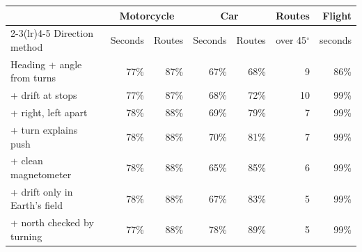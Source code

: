 \begin{tabular}{lrrrrrr}
\toprule
 & \multicolumn{2}{c}{Motorcycle} & \multicolumn{2}{c}{Car} & Routes & Flight\\
\cmidrule(lr){2-3}\cmidrule(lr){4-5}
Direction method & Seconds & Routes & Seconds & Routes & over 45$^\circ$ & seconds\\
\midrule
Heading + angle from turns & 77\% & 87\% & 67\% & 68\% & 9 & 86\% \\
\quad + drift at stops & 77\% & 87\% & 68\% & 72\% & 10 & 99\% \\
\quad + right, left apart & 78\% & 88\% & 69\% & 79\% & 7 & 99\% \\
\quad + turn explains push & 78\% & 88\% & 70\% & 81\% & 7 & 99\% \\
\quad + clean magnetometer & 78\% & 88\% & 65\% & 85\% & 6 & 99\% \\
\quad + drift only in Earth's field & 78\% & 88\% & 67\% & 83\% & 5 & 99\% \\
\quad + north checked by turning & 77\% & 88\% & 78\% & 89\% & 5 & 99\% \\
\bottomrule
\end{tabular}
